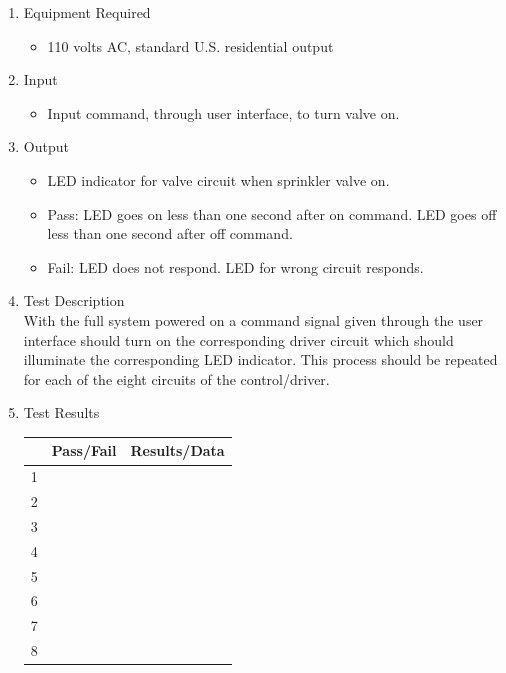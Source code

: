 \documentclass{article}
\begin{document}
\begin{enumerate}
\item Equipment Required
	\begin{itemize}
	\item 110 volts AC, standard U.S. residential output
	\end{itemize}
\item Input
	\begin{itemize}
	\item Input command, through user interface, to turn valve on.
	\end{itemize}
\item Output
	\begin{itemize}
	\item LED indicator for valve circuit when sprinkler valve on.
	\item Pass: LED goes on less than one second after on command.
		LED goes off less than one second after off command.
	\item Fail: LED does not respond.  LED for wrong circuit responds.
	\end{itemize}
\item Test Description \\

With the full system powered on a command signal
given through the user interface should turn
on the corresponding driver circuit which should illuminate
the corresponding LED indicator.
This process should be repeated for each of the
eight circuits of the control/driver.

\item Test Results \\
	\vspace{0.2in}
	\begin{tabular}{|l|l|l|}
		\hline
		& Pass/Fail & Results/Data\hspace{2in} \\
		\hline
		1 && \\
		\hline
		2 && \\
		\hline
		3 && \\
		\hline
		4 && \\
		\hline
		5 && \\
		\hline
		6 && \\
		\hline
		7 && \\
		\hline
		8 && \\
		\hline
	\end{tabular}
\end{enumerate}

\end{document}
